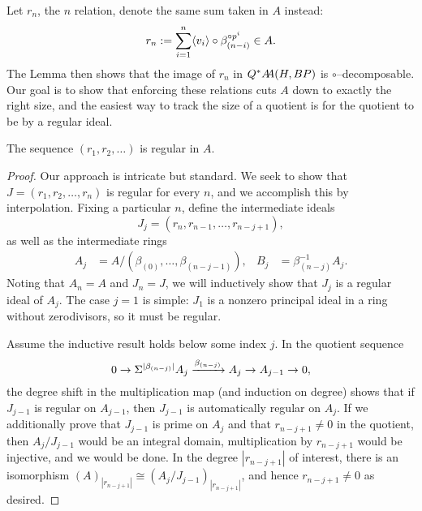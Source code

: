 Let \(r_n\), the \(n\){\th} relation, denote the same sum taken in \(A\) instead: \[r_n := \sum_{i=1}^n \<v_i\> \circ \beta_{(n-i)}^{\circ p^i} \in A.\]  The Lemma then shows that the image of \(r_n\) in \(Q^* \AA(H, BP)\) is \(\circ\)--decomposable.  Our goal is to show that enforcing these relations cuts \(A\) down to exactly the right size, and the easiest way to track the size of a quotient is for the quotient to be by a regular ideal.

\begin{lemma}
The sequence \((r_1, r_2, \ldots)\) is regular in \(A\).
\end{lemma}
\begin{proof}
Our approach is intricate but standard.  We seek to show that \(J = (r_1, r_2, \ldots, r_n)\) is regular for every \(n\), and we accomplish this by interpolation.  Fixing a particular \(n\), define the intermediate ideals \[J_j = (r_n, r_{n-1}, \ldots, r_{n-j+1}),\] as well as the intermediate rings
\begin{align*}
A_j & = A / (\beta_{(0)}, \ldots, \beta_{(n-j-1)}), &
B_j & = \beta_{(n-j)}^{-1} A_j.
\end{align*}
Noting that \(A_n = A\) and \(J_n = J\), we will inductively show that \(J_j\) is a regular ideal of \(A_j\).  The case \(j = 1\) is simple: \(J_1\) is a nonzero principal ideal in a ring without zerodivisors, so it must be regular.

Assume the inductive result holds below some index \(j\).  In the quotient sequence \[0 \to \Susp^{|\beta_{(n-j)}|} A_j \xrightarrow{\beta_{(n-j)}} A_j \to A_{j-1} \to 0,\] the degree shift in the multiplication map (and induction on degree) shows that if \(J_{j-1}\) is regular on \(A_{j-1}\), then \(J_{j-1}\) is automatically regular on \(A_j\).  If we additionally prove that \(J_{j-1}\) is prime on \(A_j\) and that \(r_{n-j+1} \ne 0\) in the quotient, then \(A_j / J_{j-1}\) would be an integral domain, multiplication by \(r_{n-j+1}\) would be injective, and we would be done.  In the degree \(|r_{n-j+1}|\) of interest, there is an isomorphism \((A)_{|r_{n-j+1}|} \cong (A_j / J_{j-1})_{|r_{n-j+1}|}\), and hence \(r_{n-j+1} \ne 0\) as desired.


\end{proof}

